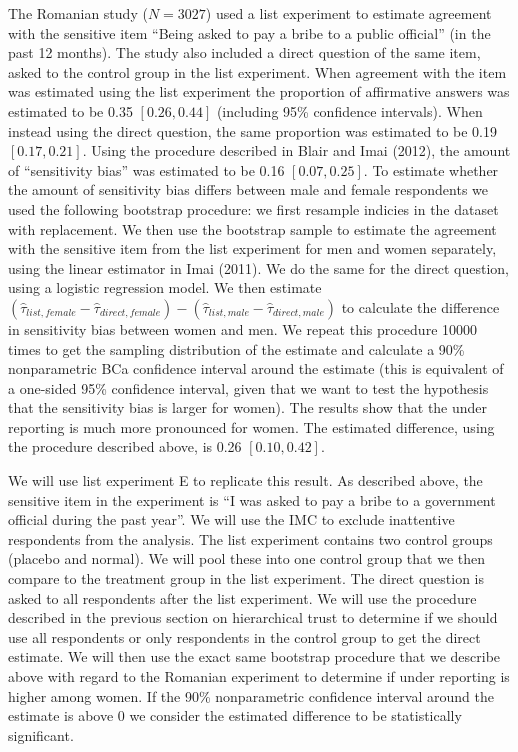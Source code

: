 \documentclass[]{article}
\begin{document}
The Romanian study (\(N=3027\)) used a list experiment to estimate
agreement with the sensitive item ``Being asked to pay a bribe to a
public official'' (in the past 12 months). The study also included a
direct question of the same item, asked to the control group in the list
experiment. When agreement with the item was estimated using the list
experiment the proportion of affirmative answers was estimated to be
0.35 \([0.26, 0.44]\) (including 95\% confidence intervals). When
instead using the direct question, the same proportion was estimated to
be 0.19 \([0.17, 0.21]\). Using the procedure described in Blair and
Imai (2012), the amount of ``sensitivity bias'' was estimated to be 0.16
\([0.07, 0.25]\). To estimate whether the amount of sensitivity bias
differs between male and female respondents we used the following
bootstrap procedure: we first resample indicies in the dataset with
replacement. We then use the bootstrap sample to estimate the agreement
with the sensitive item from the list experiment for men and women
separately, using the linear estimator in Imai (2011). We do the same
for the direct question, using a logistic regression model. We then
estimate
\((\hat{\tau}_{list, female} - \hat{\tau}_{direct, female}) - (\hat{\tau}_{list, male} - \hat{\tau}_{direct, male})\)
to calculate the difference in sensitivity bias between women and men.
We repeat this procedure 10000 times to get the sampling distribution of
the estimate and calculate a 90\% nonparametric BCa confidence interval
around the estimate (this is equivalent of a one-sided 95\% confidence
interval, given that we want to test the hypothesis that the sensitivity
bias is larger for women). The results show that the under reporting is
much more pronounced for women. The estimated difference, using the
procedure described above, is 0.26 \([0.10, 0.42]\).

We will use list experiment E to replicate this result. As described
above, the sensitive item in the experiment is ``I was asked to pay a
bribe to a government official during the past year''. We will use the
IMC to exclude inattentive respondents from the analysis. The list
experiment contains two control groups (placebo and normal). We will
pool these into one control group that we then compare to the treatment
group in the list experiment. The direct question is asked to all
respondents after the list experiment. We will use the procedure
described in the previous section on hierarchical trust to determine if
we should use all respondents or only respondents in the control group
to get the direct estimate. We will then use the exact same bootstrap
procedure that we describe above with regard to the Romanian experiment
to determine if under reporting is higher among women. If the 90\%
nonparametric confidence interval around the estimate is above 0 we
consider the estimated difference to be statistically significant.
\end{document}
